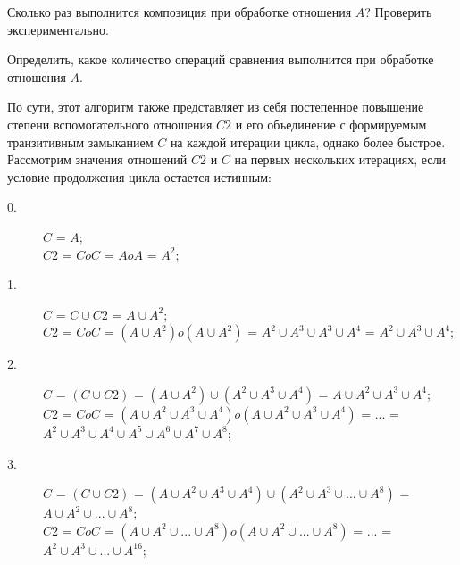 \documentclass[12pt]{article}
\begin{document}
	Сколько раз выполнится композиция при обработке отношения $A$? Проверить экспериментально.
	
	Определить, какое количество операций сравнения выполнится при обработке отношения $A$.
	
	По сути, этот алгоритм также представляет из себя постепенное повышение степени вспомогательного отношения $C2$ и его объединение с формируемым транзитивным замыканием $C$ на каждой итерации цикла, однако более быстрое. Рассмотрим значения отношений $C2$ и $C$ на первых нескольких итерациях, если условие продолжения цикла остается истинным:
	{\parskip=0.05cm
		\begin{description}
			\item[0.] $C$ = $A$; \\
			$C2$ = $C o C$ = $A o A$ = $A^2$;
			
			\item[1.] $C$ = $C \cup C2$ = $A \cup A^2$; \\
			$C2$ = $C o C$ = $(A \cup A^2) o (A \cup A^2)$ = $A^2 \cup A^3 \cup A^3 \cup A^4$ = $A^2 \cup A^3 \cup A^4$;
			
			\item[2.] $C$ = $(C \cup C2)$ = $(A \cup A^2) \cup (A^2 \cup A^3 \cup A^4)$ = $A \cup A^2 \cup A^3 \cup A^4$; \\
			$C2$ = $C o C$ = $(A \cup A^2 \cup A^3 \cup A^4) o (A \cup A^2 \cup A^3 \cup A^4)$ = ... = $A^2 \cup A^3 \cup A^4 \cup A^5 \cup A^6 \cup A^7 \cup A^8$;
			
			\item[3.] $C$ = $(C \cup C2)$ = $(A \cup A^2 \cup A^3 \cup A^4) \cup (A^2 \cup A^3 \cup ... \cup A^8)$ = $A \cup A^2 \cup ... \cup A^8$; \\
			$C2$ = $C o C$ = $(A \cup A^2 \cup ... \cup A^8) o (A \cup A^2 \cup ... \cup A^8)$ = ... = $A^2 \cup A^3 \cup ... \cup A^{16}$;	
		\end{description}
	}
\end{document}
